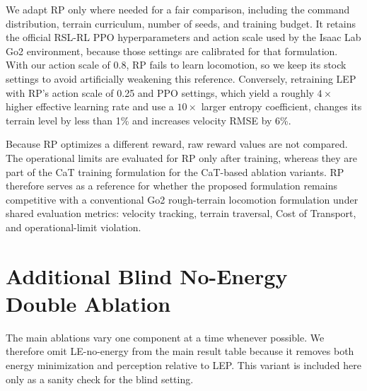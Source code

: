 \documentclass{article}
\newcommand{\baselineFour}{LEP}
\newcommand{\baselineFive}{RP}
\newcommand{\baselineFourBlindNoEnergy}{LE-no-energy} %
\begin{document}
    We adapt \baselineFive{} only where needed for a fair comparison, including the command distribution, terrain curriculum, number of seeds, and training budget. It retains the official RSL-RL PPO hyperparameters and action scale used by the Isaac Lab Go2 environment, because those settings are calibrated for that formulation. With our action scale of 0.8, \baselineFive{} fails to learn locomotion, so we keep its stock settings to avoid artificially weakening this reference. Conversely, retraining \baselineFour{} with \baselineFive{}'s action scale of 0.25 and PPO settings, which yield a roughly \(4\times\) higher effective learning rate and use a \(10\times\) larger entropy coefficient, changes its terrain level by less than 1\% and increases velocity RMSE by 6\%.
    
    Because \baselineFive{} optimizes a different reward, raw reward values are not compared. The operational limits are evaluated for \baselineFive{} only after training, whereas they are part of the CaT training formulation for the CaT-based ablation variants. \baselineFive{} therefore serves as a reference for whether the proposed formulation remains competitive with a conventional Go2 rough-terrain locomotion formulation under shared evaluation metrics: velocity tracking, terrain traversal, Cost of Transport, and operational-limit violation.

    \section{Additional Blind No-Energy Double Ablation}
    \label{app:blind-no-energy-double-ablation}
    
    The main ablations vary one component at a time whenever possible. We therefore omit \baselineFourBlindNoEnergy{} from the main result table because it removes both energy minimization and perception relative to \baselineFour{}. This variant is included here only as a sanity check for the blind setting.
    
\end{document}
